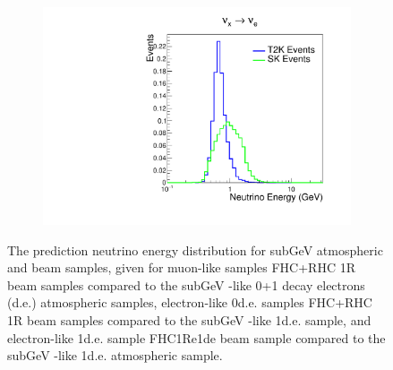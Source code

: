 \begin{figure}[h]
\begin{subfigure}[t]{0.49\textwidth}
    \includegraphics[width=\textwidth, trim={0mm 0mm 0mm 0mm}, clip,page=1]{Figures/Selections/NeutrinoEnergyDist_Comp_1Re1de_NuE.pdf}
  \end{subfigure}
  \caption{The prediction neutrino energy distribution for subGeV atmospheric and beam samples, given for muon-like samples FHC+RHC 1R\quickmath{\mu} beam samples compared to the subGeV \quickmath{\mu}-like 0+1 decay electrons (d.e.) atmospheric samples, electron-like 0d.e. samples FHC+RHC 1R beam samples compared to the subGeV -like 1d.e. sample, and electron-like 1d.e. sample FHC1Re1de beam sample compared to the subGeV -like 1d.e. atmospheric sample.}
  \label{fig:SelsAndSysts_NeutrinoEnergyComparison}
\end{figure}

